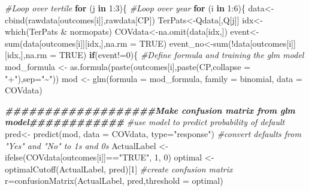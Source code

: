 \documentclass[
]{article}
\newenvironment{Shaded}{\begin{snugshade}}{\end{snugshade}}
\newcommand{\AttributeTok}[1]{\textcolor[rgb]{0.77,0.63,0.00}{#1}}
\newcommand{\CommentTok}[1]{\textcolor[rgb]{0.56,0.35,0.01}{\textit{#1}}}
\newcommand{\ConstantTok}[1]{\textcolor[rgb]{0.00,0.00,0.00}{#1}}
\newcommand{\ControlFlowTok}[1]{\textcolor[rgb]{0.13,0.29,0.53}{\textbf{#1}}}
\newcommand{\DecValTok}[1]{\textcolor[rgb]{0.00,0.00,0.81}{#1}}
\newcommand{\DocumentationTok}[1]{\textcolor[rgb]{0.56,0.35,0.01}{\textbf{\textit{#1}}}}
\newcommand{\FunctionTok}[1]{\textcolor[rgb]{0.00,0.00,0.00}{#1}}
\newcommand{\NormalTok}[1]{#1}
\newcommand{\OtherTok}[1]{\textcolor[rgb]{0.56,0.35,0.01}{#1}}
\newcommand{\SpecialCharTok}[1]{\textcolor[rgb]{0.00,0.00,0.00}{#1}}
\newcommand{\StringTok}[1]{\textcolor[rgb]{0.31,0.60,0.02}{#1}}
\begin{document}
\begin{Shaded}
\begin{Highlighting}[]
\CommentTok{\#Loop over tertile}
\ControlFlowTok{for}\NormalTok{ (j }\ControlFlowTok{in} \DecValTok{1}\SpecialCharTok{:}\DecValTok{3}\NormalTok{)\{}
  \CommentTok{\#Loop over year}
  \ControlFlowTok{for}\NormalTok{ (i }\ControlFlowTok{in} \DecValTok{1}\SpecialCharTok{:}\DecValTok{6}\NormalTok{)\{}
\NormalTok{    data}\OtherTok{\textless{}{-}}\FunctionTok{cbind}\NormalTok{(rawdata[outcomes[i]],rawdata[CP])}
\NormalTok{    TerPats}\OtherTok{\textless{}{-}}\NormalTok{Qdata[,Q[j]]}
\NormalTok{    idx}\OtherTok{\textless{}{-}}\FunctionTok{which}\NormalTok{(TerPats }\SpecialCharTok{\&}\NormalTok{ normopats)}
\NormalTok{    COVdata}\OtherTok{\textless{}{-}}\FunctionTok{na.omit}\NormalTok{(data[idx,])}
\NormalTok{    event}\OtherTok{\textless{}{-}}\FunctionTok{sum}\NormalTok{(data[outcomes[i]][idx,],}\AttributeTok{na.rm =} \ConstantTok{TRUE}\NormalTok{)}
\NormalTok{    event\_no}\OtherTok{\textless{}{-}}\FunctionTok{sum}\NormalTok{(}\SpecialCharTok{!}\NormalTok{data[outcomes[i]][idx,],}\AttributeTok{na.rm =} \ConstantTok{TRUE}\NormalTok{)}
    \ControlFlowTok{if}\NormalTok{(event}\SpecialCharTok{!=}\DecValTok{0}\NormalTok{)\{}
    \CommentTok{\#Define formula and training the glm model}
\NormalTok{    mod\_formula }\OtherTok{\textless{}{-}} \FunctionTok{as.formula}\NormalTok{(}\FunctionTok{paste}\NormalTok{(outcomes[i],}\FunctionTok{paste}\NormalTok{(CP,}\AttributeTok{collapse =} \StringTok{"+"}\NormalTok{),}\AttributeTok{sep=}\StringTok{"\textasciitilde{}"}\NormalTok{))}
\NormalTok{    mod }\OtherTok{\textless{}{-}} \FunctionTok{glm}\NormalTok{(}\AttributeTok{formula =}\NormalTok{ mod\_formula, }\AttributeTok{family =}\NormalTok{ binomial, }\AttributeTok{data =}\NormalTok{ COVdata)}
  
  
    \DocumentationTok{\#\#\#\#\#\#\#\#\#\#\#\#\#\#\#\#\#\#\#Make confusion matrix from glm model\#\#\#\#\#\#\#\#\#\#\#\#}
    \CommentTok{\#use model to predict probability of default}
\NormalTok{    pred}\OtherTok{\textless{}{-}} \FunctionTok{predict}\NormalTok{(mod, }\AttributeTok{data =}\NormalTok{ COVdata, }\AttributeTok{type=}\StringTok{"response"}\NormalTok{)}
    \CommentTok{\#convert defaults from "Yes" and "No" to 1\textquotesingle{}s and 0\textquotesingle{}s}
\NormalTok{    ActualLabel }\OtherTok{\textless{}{-}} \FunctionTok{ifelse}\NormalTok{(COVdata[outcomes[i]]}\SpecialCharTok{==}\StringTok{"TRUE"}\NormalTok{, }\DecValTok{1}\NormalTok{, }\DecValTok{0}\NormalTok{)}
\NormalTok{    optimal }\OtherTok{\textless{}{-}} \FunctionTok{optimalCutoff}\NormalTok{(ActualLabel, pred)[}\DecValTok{1}\NormalTok{]}
    \CommentTok{\#create confusion matrix}
\NormalTok{    r}\OtherTok{=}\FunctionTok{confusionMatrix}\NormalTok{(ActualLabel, pred,}\AttributeTok{threshold =}\NormalTok{ optimal)}
  

\end{Highlighting}
\end{Shaded}
\end{document}
